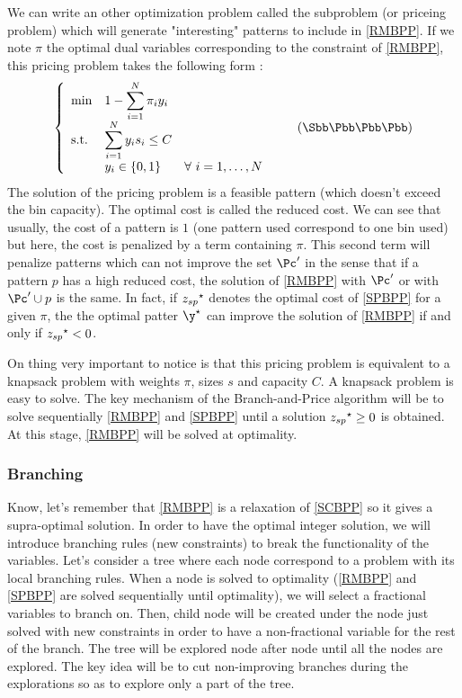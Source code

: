 We can write an other optimization problem called the subproblem (or priceing problem) which will generate "interesting" patterns to include in \eqref{RMBPP}. If we note $\pi$ the optimal dual variables corresponding to the constraint of \eqref{RMBPP}, this pricing problem takes the following form :
\begin{equation}
	\label{SPBPP}
		\left \{
		\begin{array}{*5{>{\displaystyle}l}}
		\min & 1-\sum_{i=1}^{N} \pi_i y_i \\
		\st & \sum_{i=1}^{N} y_i s_i \leq C \\
		& y_i \in \{0,1\} &  \forall \ i = 1,\dots,N
		\end{array}
		\right.
	\tag{$\Sbb\Pbb\Bbb\Pbb\Pbb$}
\end{equation}
The solution of the pricing problem is a feasible pattern (\ie which doesn't exceed the bin capacity). The optimal cost is called the reduced cost. We can see that usually, the cost of a pattern is $1$ (one pattern used correspond to one bin used) but here, the cost is penalized by a term containing $\pi$. This second term will penalize patterns which can not improve the set $\Pc'$ in the sense that if a pattern $p$ has a high reduced cost, the solution of \eqref{RMBPP} with $\Pc'$ or with $\Pc' \cup p$ is the same. In fact, if ${z_{sp}}^{\star}$ denotes the optimal cost of \eqref{SPBPP} for a given $\pi$, the the optimal patter $\opt{\y}$ can improve the solution of \eqref{RMBPP}
if and only if ${z_{sp}}^{\star}<0$.

On thing very important to notice is that this pricing problem is equivalent to a knapsack problem with weights $\pi$, sizes $s$ and capacity $C$. A knapsack problem is easy to solve. The key mechanism of the Branch-and-Price algorithm will be to solve sequentially \eqref{RMBPP} and \eqref{SPBPP} until a solution ${z_{sp}}^{\star} \geq 0$ is obtained. At this stage, \eqref{RMBPP} will be solved at optimality.

\subsubsection{Branching}

Know, let's remember that \eqref{RMBPP} is a relaxation of \eqref{SCBPP} so it gives a supra-optimal solution. In order to have the optimal integer solution, we will introduce branching rules (new constraints) to break the functionality of the variables. Let's consider a tree where each node correspond to a problem with its local branching rules. When a node is solved to optimality (\ie \eqref{RMBPP} and \eqref{SPBPP} are solved sequentially until optimality), we will select a fractional variables to branch on. Then, child node will be created under the node just solved with new constraints in order to have a non-fractional variable for the rest of the branch. The tree will be explored node after node until all the nodes are explored. The key idea will be to cut non-improving branches during the explorations so as to explore only a part of the tree.

